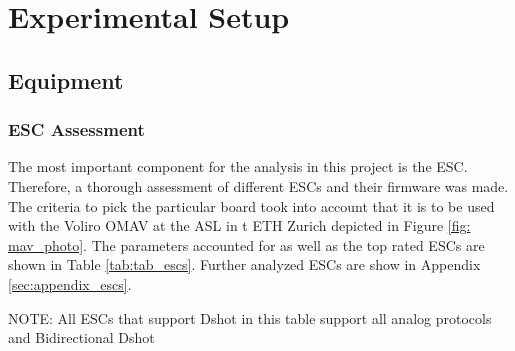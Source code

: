 \chapter{Experimental Setup}
\section{Equipment}
\subsection{ESC Assessment}
The most important component for the analysis in this project is the ESC. Therefore, a thorough assessment of different ESCs and their firmware was made. The criteria to pick the particular board took into account that it is to be used with the Voliro OMAV at the ASL in t ETH Zurich depicted in Figure \ref{fig: mav_photo}. The parameters accounted for as well as the top rated ESCs are shown in Table \ref{tab:tab_escs}. Further analyzed ESCs are show in Appendix \ref{sec:appendix_escs}.

\begin{table}
\small

\begin{center}
 	\caption{ESC protocols' speeds}\vspace{1ex}
 	\label{tab:tab_escs}

\end{center}
\footnotesize{NOTE: All ESCs that support Dshot in this table support all analog protocols and Bidirectional Dshot}
\end{table}

